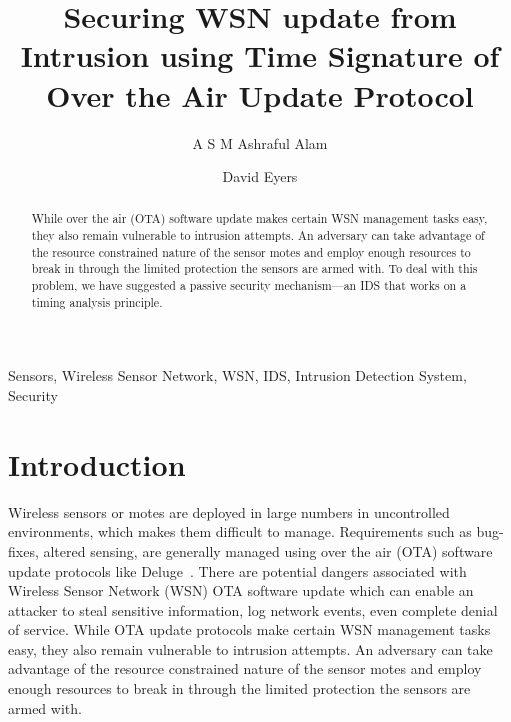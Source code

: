 \documentclass{CRPITStyle}
\renewcommand{\cite}{\citep}
\begin{document}
\title{Securing WSN update from Intrusion using Time Signature of Over the Air Update Protocol}
\author{A S M Ashraful Alam  \and  David Eyers 	  }

\maketitle

\newcommand\conferencenameandplace{Twenty-Ninth Australasian Computer Science Conference (ACSC2006), Hobart, Australia}
\newcommand\volumenumber{48}
\newcommand\conferenceyear{2006}
\newcommand\editorname{Vladimir Estivill-Castro and Gillian Dobbie}
\toappearstandard 

\begin{abstract}
While over the air (OTA) software update makes certain WSN management tasks easy, they also remain vulnerable to intrusion attempts.
An adversary can take advantage of the resource constrained nature of the sensor motes and employ enough resources to break in through the limited protection the sensors are armed with.
To deal with this problem, we have suggested a passive security mechanism---an IDS that works on a timing analysis principle.  
\end{abstract}
\vspace{.1in}

 Sensors, Wireless Sensor Network, WSN, IDS, Intrusion Detection System, Security

\section{Introduction}
\label{sec:intro}

Wireless sensors or motes are deployed in large numbers in uncontrolled environments, which makes them difficult to manage.
Requirements such as bug-fixes, altered sensing, are generally managed using over the air (OTA) software update protocols like Deluge~\cite{1031506}.
There are potential dangers associated with Wireless Sensor Network (WSN) OTA software update which can enable an attacker to steal sensitive information, log network events, even complete denial of service.
While OTA update protocols make certain WSN management tasks easy, they also remain vulnerable to intrusion attempts.
An adversary can take advantage of the resource constrained nature of the sensor motes and employ enough resources to break in through the limited protection the sensors are armed with.
\end{document}
